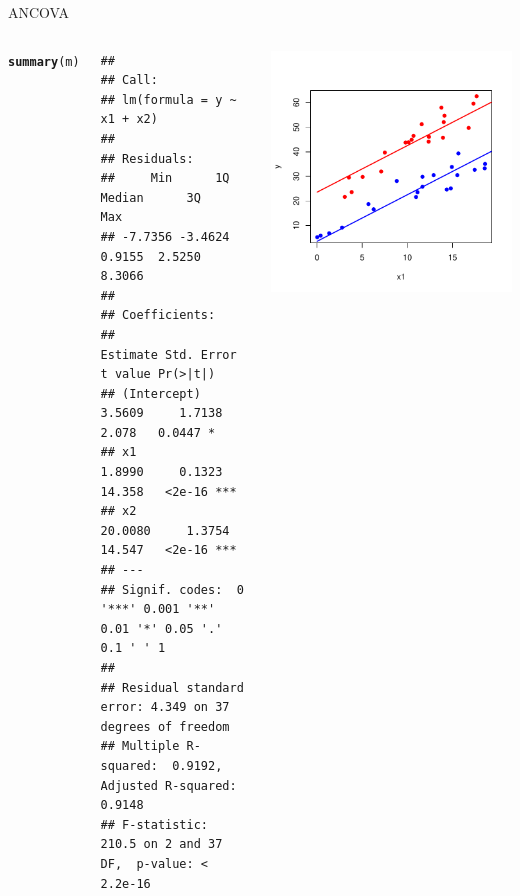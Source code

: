 \documentclass{beamer}\usepackage[]{graphicx}\usepackage[]{color}
\makeatletter
\newcommand{\hlstd}[1]{\textcolor[rgb]{0.345,0.345,0.345}{#1}}%
\newcommand{\hlkwd}[1]{\textcolor[rgb]{0.737,0.353,0.396}{\textbf{#1}}}%
\newenvironment{kframe}{%
 \def\at@end@of@kframe{}%
 \ifinner\ifhmode%
  \def\at@end@of@kframe{\end{minipage}}%
  \begin{minipage}{\columnwidth}%
 \fi\fi%
 \def\FrameCommand##1{\hskip\@totalleftmargin \hskip-\fboxsep
 \colorbox{shadecolor}{##1}\hskip-\fboxsep
     \hskip-\linewidth \hskip-\@totalleftmargin \hskip\columnwidth}%
 \MakeFramed {\advance\hsize-\width
   \@totalleftmargin\z@ \linewidth\hsize
   \@setminipage}}%
 {\par\unskip\endMakeFramed%
 \at@end@of@kframe}
\newenvironment{knitrout}{}{} %
\renewenvironment{knitrout}{\setlength{\topsep}{0mm}}{}
\makeatother
\begin{document}
\begin{frame}[fragile]{ANCOVA}

\begin{columns}

\setlength{\topsep}{2pt}
\begin{knitrout}\tiny
{}\color{fgcolor}\begin{kframe}
\begin{alltt}
\hlkwd{summary}\hlstd{(m)}
\end{alltt}
\begin{verbatim}
## 
## Call:
## lm(formula = y ~ x1 + x2)
## 
## Residuals:
##     Min      1Q  Median      3Q     Max 
## -7.7356 -3.4624  0.9155  2.5250  8.3066 
## 
## Coefficients:
##             Estimate Std. Error t value Pr(>|t|)    
## (Intercept)   3.5609     1.7138   2.078   0.0447 *  
## x1            1.8990     0.1323  14.358   <2e-16 ***
## x2           20.0080     1.3754  14.547   <2e-16 ***
## ---
## Signif. codes:  0 '***' 0.001 '**' 0.01 '*' 0.05 '.' 0.1 ' ' 1
## 
## Residual standard error: 4.349 on 37 degrees of freedom
## Multiple R-squared:  0.9192,	Adjusted R-squared:  0.9148 
## F-statistic: 210.5 on 2 and 37 DF,  p-value: < 2.2e-16
\end{verbatim}
\end{kframe}
\end{knitrout}


\begin{knitrout}
\color{fgcolor}
\includegraphics[width=1.1\linewidth]{figure/ancovplot2-1} 

\end{knitrout}


\end{columns}

\end{frame}
\end{document}
